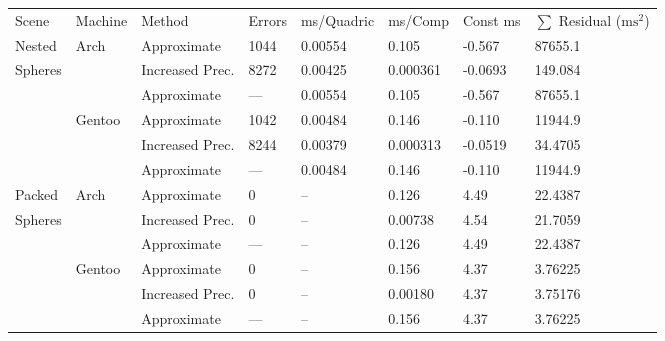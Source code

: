 \begin{tabular}{|l|l|ll|lll|l|}
\hline
Scene & Machine & Method & Errors & ms/Quadric & ms/Comp & Const ms & $\sum$ Residual ($\text{ms}^2$)\\
\hhline{|=|=|==|===|=|}
\hhline{|~|-|--|---|-|}
Nested & Arch & Approximate & 1044 & 0.00554 & \hphantom{-}0.105 & -0.567 & \hphantom{0}\hphantom{-}87655.1\\
Spheres &  & Increased Prec. & 8272 & 0.00425 & \hphantom{-}0.000361 & -0.0693 & \hphantom{000}\hphantom{-}149.084\\
 &  & Approximate & \hphantom{-}--- & 0.00554 & \hphantom{-}0.105 & -0.567 & \hphantom{0}\hphantom{-}87655.1\\
\hhline{|~|-|--|---|-|}
 & Gentoo & Approximate & 1042 & 0.00484 & \hphantom{-}0.146 & -0.110 & \hphantom{0}\hphantom{-}11944.9\\
 &  & Increased Prec. & 8244 & 0.00379 & \hphantom{-}0.000313 & -0.0519 & \hphantom{0000}\hphantom{-}34.4705\\
 &  & Approximate & \hphantom{-}--- & 0.00484 & \hphantom{-}0.146 & -0.110 & \hphantom{0}\hphantom{-}11944.9\\
\hhline{|-|-|--|---|-|}
\hhline{|~|-|--|---|-|}
Packed & Arch & Approximate & \hphantom{00}0 & -- & \hphantom{-}0.126 & \hphantom{-}4.49 & \hphantom{0000}\hphantom{-}22.4387\\
Spheres &  & Increased Prec. & \hphantom{00}0 & -- & \hphantom{-}0.00738 & \hphantom{-}4.54 & \hphantom{0000}\hphantom{-}21.7059\\
 &  & Approximate & \hphantom{-}--- & -- & \hphantom{-}0.126 & \hphantom{-}4.49 & \hphantom{0000}\hphantom{-}22.4387\\
\hhline{|~|-|--|---|-|}
 & Gentoo & Approximate & \hphantom{00}0 & -- & \hphantom{-}0.156 & \hphantom{-}4.37 & \hphantom{00000}\hphantom{-}3.76225\\
 &  & Increased Prec. & \hphantom{00}0 & -- & \hphantom{-}0.00180 & \hphantom{-}4.37 & \hphantom{00000}\hphantom{-}3.75176\\
 &  & Approximate & \hphantom{-}--- & -- & \hphantom{-}0.156 & \hphantom{-}4.37 & \hphantom{00000}\hphantom{-}3.76225\\
\hline
\end{tabular}
